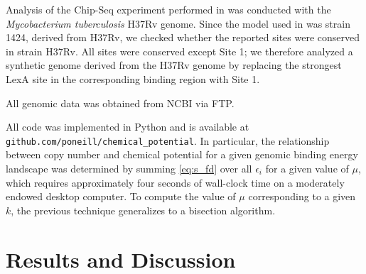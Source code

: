\documentclass{article}
\begin{document}
Analysis of the Chip-Seq experiment performed in \cite{smollett12} was
conducted with the \textit{Mycobacterium tuberculosis} H37Rv genome.
Since the model used in \cite{smollett12} was strain 1424, derived
from H37Rv, we checked whether the reported sites were conserved in
strain H37Rv.  All sites were conserved except Site 1; we therefore
analyzed a synthetic genome derived from the H37Rv genome by replacing
the strongest LexA site in the corresponding binding region with Site
1.

All genomic data was obtained from NCBI via FTP.

All code was implemented in Python and is available at
\texttt{github.com/poneill/chemical\_potential}.  In particular, the
relationship between copy number and chemical potential for a given
genomic binding energy landscape was determined by summing
\ref{eq:s_fd} over all $\epsilon_i$ for a given value of $\mu$, which
requires approximately four seconds of wall-clock time on a moderately
endowed desktop computer.  To compute the value of $\mu$ corresponding
to a given $k$, the previous technique generalizes to a bisection
algorithm.

\section{Results and Discussion}
\end{document}
